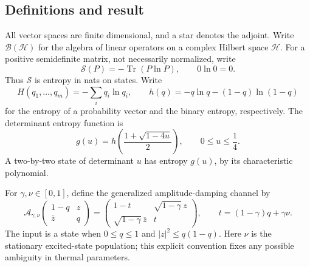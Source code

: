 \documentclass[11pt]{article}
\theoremstyle{remark}
\DeclareMathOperator{\Tr}{Tr}
\newcommand{\A}{\mathcal A}
\newcommand{\ent}{\mathcal S}
\numberwithin{equation}{section}
\begin{document}
\subsection{Definitions and result}

All vector spaces are finite dimensional, and a star denotes the
adjoint. Write $\mathcal B(\mathcal H)$ for the algebra of linear
operators on a complex Hilbert space $\mathcal H$. For a positive
semidefinite matrix, not necessarily normalized, write
\[
 \ent(P)=-\Tr(P\ln P),\qquad 0\ln0=0.
\]
Thus $\ent$ is entropy in nats on states. Write
\[
 H(q_1,\ldots,q_m)=-\sum_iq_i\ln q_i,\qquad
 h(q)=-q\ln q-(1-q)\ln(1-q)
\]
for the entropy of a probability vector and the binary entropy,
respectively. The determinant entropy function is
\begin{equation}\label{eq:g}
 g(u)=h\!\left(\frac{1+\sqrt{1-4u}}2\right),
 \qquad 0\le u\le\frac14.
\end{equation}
A two-by-two state of determinant $u$ has entropy $g(u)$, by its
characteristic polynomial.

For $\gamma,\nu\in[0,1]$, define the generalized amplitude-damping
channel by
\begin{equation}\label{eq:channel}
 \A_{\gamma,\nu}
 \begin{pmatrix}1-q&z\\\overline z&q\end{pmatrix}
 =\begin{pmatrix}1-t&\sqrt{1-\gamma}\,z\\
 \sqrt{1-\gamma}\,\overline z&t\end{pmatrix},
 \qquad t=(1-\gamma)q+\gamma\nu.
\end{equation}
The input is a state when $0\le q\le1$ and $|z|^2\le q(1-q)$.
Here $\nu$ is the stationary excited-state population; this explicit
convention fixes any possible ambiguity in thermal parameters.
\end{document}

